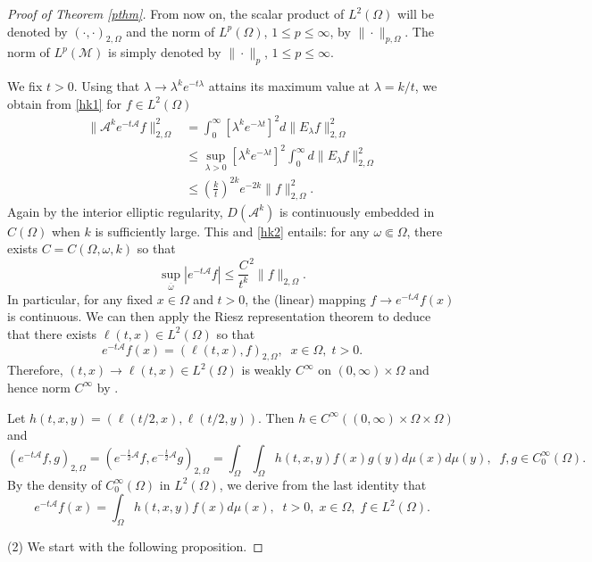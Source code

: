 \documentclass[10pt]{amsart}
\theoremstyle{definition}
\begin{document}
\begin{proof}[Proof of Theorem \ref{pthm}]
\smallskip
From now on, the scalar product of $L^2(\Omega )$ will be denoted by $(\cdot ,\cdot )_{2,\Omega}$ and the norm of $L^p(\Omega )$, $1\leq p\leq \infty$, by $\|\cdot \|_{p,\Omega}$. The norm of $L^p(\mathcal{M})$ is simply denoted by $\|\cdot \|_p$, $1\leq p\leq \infty$.

\smallskip
We fix $t>0$. Using that $\lambda \rightarrow \lambda ^ke^{-t\lambda}$ attains its maximum value at $\lambda =k/t$, we obtain  from \eqref{hk1} for $f\in L^2(\Omega )$
\begin{align}
\|\mathcal{A}^ke^{-t\mathcal{A}}f\|_{2,\Omega}^2&=\int_0^\infty [\lambda ^ke^{-\lambda t}]^2d\|E_\lambda f\|_{2,\Omega}^2\label{hk2}
\\
&\leq \sup_{\lambda >0}[\lambda ^ke^{-\lambda t}]^2\int_0^\infty d\|E_\lambda f\|_{2,\Omega}^2\nonumber
\\
&\leq \left(\frac{k}{t}\right)^{2k}e^{-2k}\|f\|_{2,\Omega}^2. \nonumber
\end{align}
Again by the interior elliptic regularity, $D(\mathcal{A}^k)$ is continuously embedded in $C(\Omega )$ when $k$ is sufficiently large. This and \eqref{hk2} entails: for any $\omega \Subset \Omega$, there exists $C=C(\Omega ,\omega ,k)$ so that
\begin{equation}\label{hk3}
\sup_{\overline{\omega}}|e^{-t\mathcal{A}}f|\leq  \frac{C}{t^k}^2\|f\|_{2,\Omega}.
\end{equation}
In particular, for any fixed $x\in \Omega$ and $t>0$, the (linear) mapping $f\rightarrow e^{-t\mathcal{A}}f(x)$ is continuous. We can then apply the Riesz representation theorem to deduce that there exists $\ell (t,x)\in L^2(\Omega )$ so that
\[
e^{-t\mathcal{A}}f(x)=(\ell (t,x),f)_{2,\Omega},\;\; x\in \Omega ,\; t>0.
\]
Therefore, $(t,x)\rightarrow \ell (t,x)\in L^2(\Omega )$ is weakly $C^\infty$ on $(0,\infty )\times \Omega$ and hence norm $C^\infty$ by \cite[Section 1.5]{da}. 

\smallskip
Let $h(t,x,y)=(\ell (t/2,x),\ell (t/2,y))$. Then $h\in C^\infty ((0,\infty )\times \Omega\times \Omega )$ and 
\[
\left(e^{-t\mathcal{A}}f,g\right)_{2,\Omega}=\left(e^{-\frac{t}{2}\mathcal{A}}f,e^{-\frac{t}{2}\mathcal{A}}g\right)_{2,\Omega}=\int_\Omega \int_\Omega h(t,x,y)f(x)g(y)d\mu(x)d\mu (y),\;\; f,g\in C_0^\infty (\Omega ).
\]
By the density of $C_0^\infty (\Omega )$ in $L^2(\Omega )$, we derive from the last identity that
\[
e^{-t\mathcal{A}}f(x)=\int_\Omega h(t,x,y)f(x)d\mu (x),\;\; t>0,\; x\in \Omega ,\; f\in L^2(\Omega ).
\]

(2) We start with the following proposition. 


\end{proof}
\end{document}
